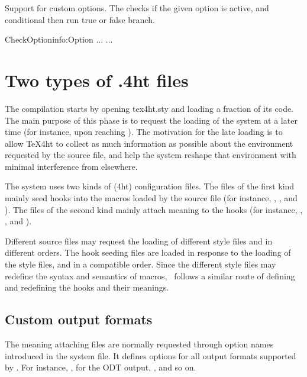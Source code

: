 Support for custom options. The  checks if the given option
is active, and  conditional then run true or false branch.

\begin{texsource}
\:CheckOption{info}\if:Option
... \else ...
\fi
\end{texsource}
      
\section{Two types of .4ht files}


The compilation starts by opening tex4ht.sty and loading a fraction of its code.
The main purpose of this phase is to request the loading of the system at a
later time (for instance, upon reaching \texcommand{}). The motivation for
the late loading is to allow TeX4ht to collect as much information as possible
about the environment requested by the source file, and help the system reshape
that environment with minimal interference from elsewhere.

The system uses two kinds of (4ht) configuration files. The files of the first
kind mainly seed hooks into the macros loaded by the source file (for instance,
, , and ).
The files of the second kind mainly
attach meaning to the hooks (for instance, , , and
).

Different source files may request the loading of different style files and in
different orders. The hook seeding files are loaded in response to the loading
of the style files, and in a compatible order. Since the different style files
may redefine the syntax and semantics of macros, \texfourht\ follows a similar route
of defining and redefining the hooks and their meanings.



\subsection{Custom output formats}

The meaning attaching files are normally requested through option names
introduced in the  system file. It defines options for all output formats
supported by \texfourht. For instance, ,  for the ODT output,
, and so on. 


